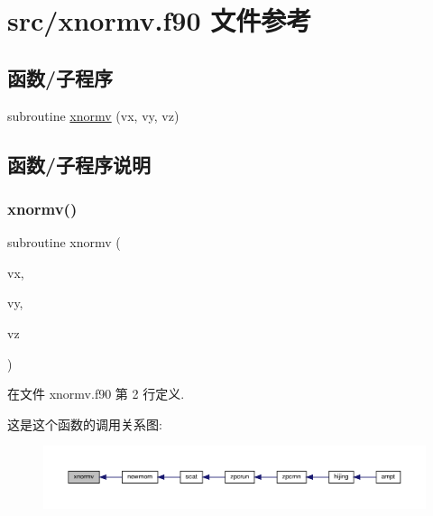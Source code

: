 \hypertarget{xnormv_8f90}{}\section{src/xnormv.f90 文件参考}
\label{xnormv_8f90}
\subsection*{函数/子程序}
\begin{DoxyCompactItemize}
\item 
subroutine \mbox{\hyperlink{xnormv_8f90_a9ea6f9ebd046eb2589ff2e29b06a32c3}{xnormv}} (vx, vy, vz)
\end{DoxyCompactItemize}


\subsection{函数/子程序说明}
\mbox{\label{xnormv_8f90_a9ea6f9ebd046eb2589ff2e29b06a32c3}} 
\subsubsection{\texorpdfstring{xnormv()}{xnormv()}}
{\footnotesize\ttfamily subroutine xnormv (\begin{DoxyParamCaption}\item[{}]{vx,  }\item[{}]{vy,  }\item[{}]{vz }\end{DoxyParamCaption})}



在文件 xnormv.\+f90 第 2 行定义.

这是这个函数的调用关系图\+:
\nopagebreak
\begin{figure}[H]
\begin{center}
\leavevmode
\includegraphics[width=350pt]{xnormv_8f90_a9ea6f9ebd046eb2589ff2e29b06a32c3_icgraph}
\end{center}
\end{figure}
